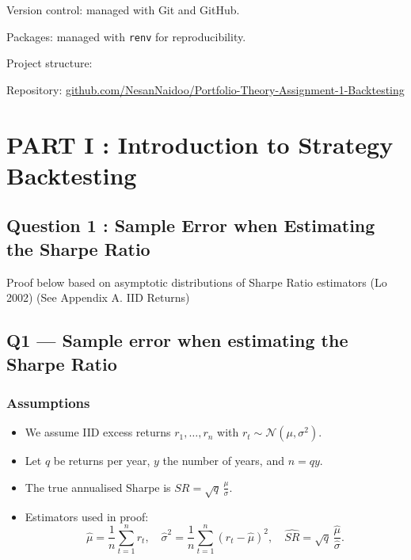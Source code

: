 \documentclass[
  12pt,
]{article}
\begin{document}
Version control: managed with Git and GitHub.

Packages: managed with \texttt{renv} for reproducibility.

Project structure:

Repository:
\href{https://github.com/NesanNaidoo/Portfolio-Theory-Assignment-1-Backtesting}{github.com/NesanNaidoo/Portfolio-Theory-Assignment-1-Backtesting}

\section{PART I : Introduction to Strategy
Backtesting}\label{part-i-introduction-to-strategy-backtesting}

\subsection{Question 1 : Sample Error when Estimating the Sharpe
Ratio}\label{question-1-sample-error-when-estimating-the-sharpe-ratio}

Proof below based on asymptotic distributions of Sharpe Ratio estimators
(Lo 2002) (See Appendix A. IID Returns)

\subsection{Q1 --- Sample error when estimating the Sharpe
Ratio}\label{q1-sample-error-when-estimating-the-sharpe-ratio}

\subsubsection{Assumptions}\label{assumptions}

\begin{itemize}
\item
  We assume IID excess returns \(r_1,\dots,r_n\) with
  \(r_t \sim \mathcal{N}(\mu,\sigma^2).\)
\item
  Let \(q\) be returns per year, \(y\) the number of years, and
  \(n=qy\).
\item
  The true annualised Sharpe is \(SR=\sqrt{q}\,\frac{\mu}{\sigma}.\)
\item
  Estimators used in proof: \[
  \widehat\mu=\frac{1}{n}\sum_{t=1}^n r_t,\quad
  \widehat\sigma^2=\frac{1}{n}\sum_{t=1}^n (r_t-\widehat\mu)^2,\quad
  \widehat{SR}=\sqrt{q}\,\frac{\widehat\mu}{\widehat\sigma}.
  \]
\end{itemize}
\end{document}
